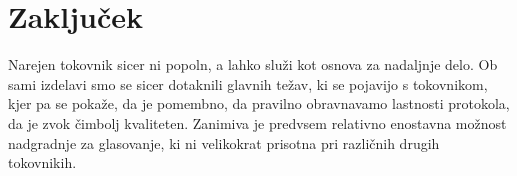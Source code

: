 \documentclass[journal]{IEEEtran}
\begin{document}
%





\section{Zaključek}
Narejen tokovnik sicer ni popoln, a lahko služi kot osnova za nadaljnje delo.
Ob sami izdelavi smo se sicer dotaknili glavnih težav,
ki se pojavijo s tokovnikom, kjer pa se pokaže, da je pomembno, da pravilno
obravnavamo lastnosti protokola, da je zvok čimbolj kvaliteten. Zanimiva
je predvsem relativno enostavna možnost nadgradnje za glasovanje, ki ni velikokrat prisotna
pri različnih drugih tokovnikih.




\end{document}
